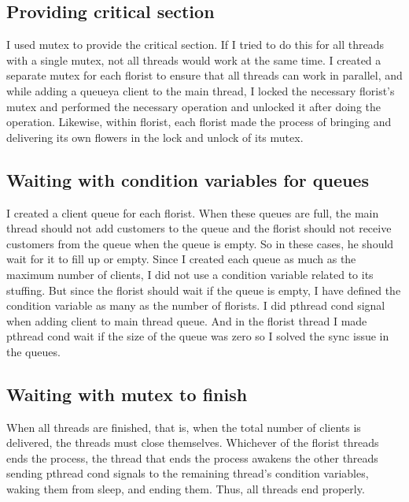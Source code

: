 \documentclass{article}
\begin{document}
\subsection{Providing critical section}
\par{I used mutex to provide the critical section. If I tried to do this for all threads with a single mutex, not all threads would work at the same time. I created a separate mutex for each florist to ensure that all threads can work in parallel, and while adding a queueya client to the main thread, I locked the necessary florist's mutex and performed the necessary operation and unlocked it after doing the operation. Likewise, within florist, each florist made the process of bringing and delivering its own flowers in the lock and unlock of its mutex.}


\subsection{Waiting with condition variables for queues}
\par{I created a client queue for each florist. When these queues are full, the main thread should not add customers to the queue and the florist should not receive customers from the queue when the queue is empty. So in these cases, he should wait for it to fill up or empty. Since I created each queue as much as the maximum number of clients, I did not use a condition variable related to its stuffing. But since the florist should wait if the queue is empty, I have defined the condition variable as many as the number of florists. I did pthread cond signal when adding client to main thread queue. And in the florist thread I made pthread cond wait if the size of the queue was zero so I solved the sync issue in the queues.}


\subsection{Waiting with mutex to finish}
\par{When all threads are finished, that is, when the total number of clients is delivered, the threads must close themselves. Whichever of the florist threads ends the process, the thread that ends the process awakens the other threads sending pthread cond signals to the remaining thread's condition variables, waking them from sleep, and ending them. Thus, all threads end properly.}
\end{document}
